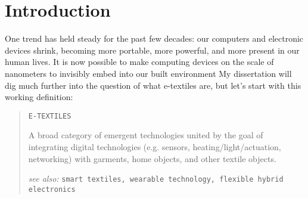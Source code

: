 \chapter{Introduction}
\label{ch-intro}

\setlength{\parindent}{0.5in}

\par
One trend has held steady for the past few decades: our computers and electronic devices shrink, becoming more portable, more powerful, and more present in our human lives. It is now possible to make computing devices on the scale of nanometers to invisibly embed into our built environment
My dissertation will dig much further into the question of what e-textiles are, but let's start with this working definition:

\begin{quote}
  \texttt{E-TEXTILES}

  A broad category of emergent technologies united by the goal of integrating digital technologies (e.g. sensors, heating/light/actuation, networking) with garments, home objects, and other textile objects.

  \textit{see also:} \texttt{\small{}smart textiles, wearable technology, flexible hybrid electronics}
\end{quote}

\par
{}

